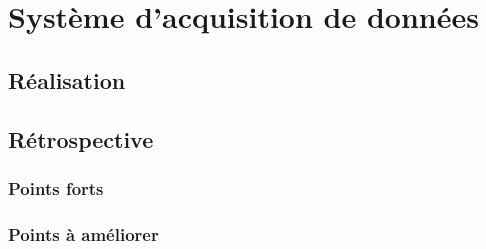 \chapter{Système d'acquisition de données}
\label{chap:acquisition}

\section{Réalisation}



\section{Rétrospective}

\subsection{Points forts}



\subsection{Points à améliorer}
